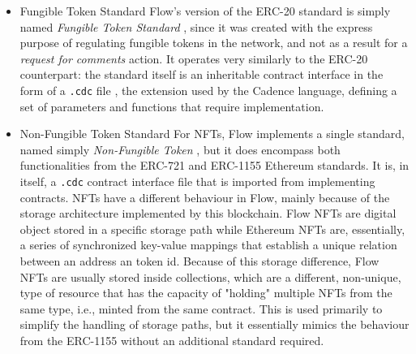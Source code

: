 \documentclass[../main.tex]{subfiles}
\begin{document}
\begin{itemize}
    \item {Fungible Token Standard} Flow's version of the ERC-20 standard is simply named \textit{Fungible Token Standard} \cite{Dapper2022a}, since it was created with the express purpose of regulating fungible tokens in the network, and not as a result for a \textit{request for comments} action. It operates very similarly to the ERC-20 counterpart: the standard itself is an inheritable contract interface in the form of a \verb|.cdc| file \cite{Dapper2022c}, the extension used by the Cadence language, defining a set of parameters and functions that require implementation.

    \item {Non-Fungible Token Standard} For NFTs, Flow implements a single standard, named simply \textit{Non-Fungible Token} \cite{Dapper2022b}, but it does encompass both functionalities from the ERC-721 and ERC-1155 Ethereum standards. It is, in itself, a \verb|.cdc| \cite{Dapper2022d} contract interface file that is imported from implementing contracts. NFTs have a different behaviour in Flow, mainly because of the storage architecture implemented by this blockchain. Flow NFTs are digital object stored in a specific storage path while Ethereum NFTs are, essentially, a series of synchronized key-value mappings that establish a unique relation between an address an token id. Because of this storage difference, Flow NFTs are usually stored inside collections, which are a different, non-unique, type of resource that has the capacity of "holding" multiple NFTs from the same type, i.e., minted from the same contract. This is used primarily to simplify the handling of storage paths, but it essentially mimics the behaviour from the ERC-1155 without an additional standard required.
\end{itemize}
\end{document}
